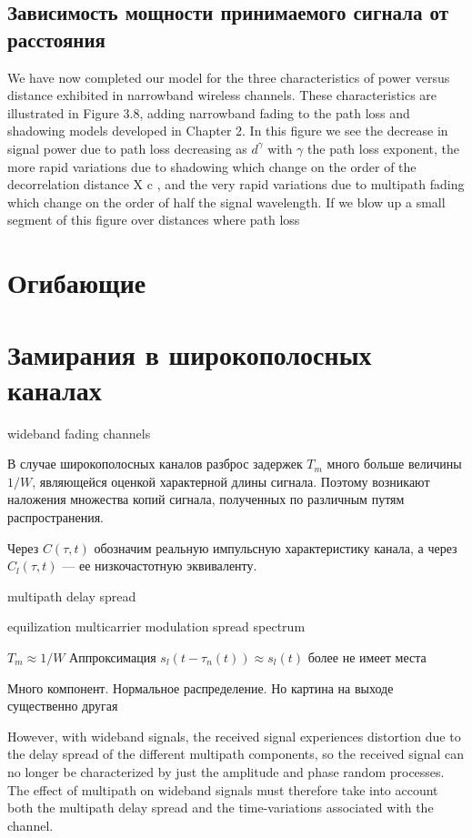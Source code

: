 \documentclass{book}
\numberwithin{theorem}{chapter}
\numberwithin{statement}{chapter}
\numberwithin{lemma}{chapter}
\theoremstyle{definition}
\numberwithin{task}{chapter}
\theoremstyle{remark}
\numberwithin{example}{chapter}
\theoremstyle{definition}
\numberwithin{definition}{chapter}
\theoremstyle{remark}
\theoremstyle{remark}
\numberwithin{lyrics}{section}
\begin{document}
\subsection{Зависимость мощности принимаемого сигнала от расстояния}
We have now completed our model for the three characteristics of power versus distance exhibited in narrowband wireless channels. These characteristics are illustrated in Figure 3.8, adding narrowband fading to the path loss and shadowing models developed in Chapter 2. In this figure we see the decrease in signal power due to path loss decreasing as $d^\gamma$ with $\gamma$ the path loss exponent, the more rapid variations due to shadowing which change on the order of the decorrelation distance X c , and the very rapid variations due to multipath fading which change on
the order of half the signal wavelength. If we blow up a small segment of this figure over distances where path loss

\section{Огибающие}



\section{Замирания в широкополосных каналах}
wideband fading channels

В случае широкополосных каналов разброс задержек $T_m$ много больше величины $1/W$, являющейся оценкой характерной длины сигнала. Поэтому возникают наложения множества копий сигнала, полученных по различным путям распространения. 

Через $C(\tau, t)$ обозначим реальную импульсную характеристику канала, а через $C_l(\tau, t)$ --- ее низкочастотную эквиваленту.


multipath delay spread

equilization
multicarrier modulation
spread spectrum

$T_m \approx 1/W$ Аппроксимация $s_l(t - \tau_n(t)) \approx s_l(t)$ более не имеет места 

Много компонент. Нормальное распределение. Но картина на выходе существенно другая

However, with wideband signals, the received signal
experiences distortion due to the delay spread of the different multipath components, so the received signal can no
longer be characterized by just the amplitude and phase random processes. The effect of multipath on wideband
signals must therefore take into account both the multipath delay spread and the time-variations associated with
the channel.
\end{document}
